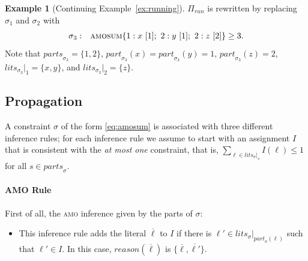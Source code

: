 \documentclass[preprint,authoryear]{elsarticle}
\theoremstyle{definition}
\newtheorem{example}{Example}[section]
\def\amosum{\ensuremath{\textsc{amosum}}\xspace}
\begin{document}
\begin{example}[Continuing Example~\ref{ex:running}]\label{ex:running-revised}
$\Pi_{\mathit{run}}$ is rewritten by replacing $\sigma_1$ and $\sigma_2$ with
\begin{align*}
\begin{array}{rl}
    \sigma_{3}: & \amosum\{
        1 : x\ [1];\ 2 : y\ [1];\ 2 : z\ [2]
    \} \geq 3.
\end{array}
\end{align*}
Note that $\mathit{parts}_{\sigma_3}=\{1, 2\}$, 
$\mathit{part}_{\sigma_{3}}(x) = \mathit{part}_{\sigma_{3}}(y) = 1$, 
$\mathit{part}_{\sigma_{3}}(z) = 2$, 
$\mathit{lits}_{\sigma_{3}}|_1 = \{x, y\}$, and
$\mathit{lits}_{\sigma_{3}}|_2 = \{z\}$.

\end{example}

\subsection{Propagation}\label{sec:amo:propagator}
A constraint $\sigma$ of the form \eqref{eq:amosum} is associated with three different inference rules; for each inference rule we assume to start with an assignment $I$ that is consistent with the \textit{at most one} constraint, that is, $\sum_{\ell \in \mathit{lits}_\sigma|_s}{I(\ell)} \leq 1$ for all $s \in \mathit{parts}_{\sigma}$.

\paragraph{AMO Rule}
First of all, the \textsc{amo} inference given by the parts of $\sigma$:
\begin{itemize}
    \item[\textbf{(RA)}] This inference rule adds the literal $\overline{\ell}$ to $I$ if there is $\ell' \in \mathit{lits}_\sigma|_{\mathit{part}_\sigma(\ell)}$ such that $\ell' \in I$.
In this case, $\mathit{reason}(\overline{\ell})$ is $\{\overline{\ell}, \overline{\ell'}\}$.

\end{itemize}
%
\end{document}
